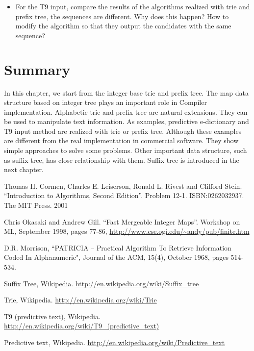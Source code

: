 \documentclass{article}
\begin{document}
\begin{Exercise}
\begin{itemize}
\item For the T9 input, compare the results of the algorithms realized with trie and prefix tree,
the sequences are different. Why does this happen? How to modify the algorithm so that they
output the candidates with the same sequence?
\end{itemize}
\end{Exercise}

\section{Summary}

In this chapter, we start from the integer base trie and prefix tree. The
map data structure based on integer tree plays an important role
in Compiler implementation. Alphabetic trie and prefix tree are
natural extensions. They can be used to manipulate text information.
As examples, predictive e-dictionary and T9 input method are
realized with trie or prefix tree. Although these examples
are different from the real implementation in commercial software.
They show simple approaches to solve some problems.
Other important data structure, such as suffix tree, has close
relationship with them. Suffix tree is introduced in the next chapter.

\begin{thebibliography}{99}

Thomas H. Cormen, Charles E. Leiserson, Ronald L. Rivest and Clifford Stein.
``Introduction to Algorithms, Second Edition''. Problem 12-1. ISBN:0262032937. The MIT Press. 2001

Chris Okasaki and Andrew Gill. ``Fast Mergeable Integer
Maps''. Workshop on ML, September 1998, pages 77-86, \url{http://www.cse.ogi.edu/~andy/pub/finite.htm}

D.R. Morrison, ``PATRICIA -- Practical Algorithm To Retrieve  Information Coded In Alphanumeric", Journal of the ACM, 15(4), October 1968, pages 514-534.

Suffix Tree, Wikipedia. \url{http://en.wikipedia.org/wiki/Suffix_tree}

Trie, Wikipedia. \url{http://en.wikipedia.org/wiki/Trie}

T9 (predictive text), Wikipedia. \url{http://en.wikipedia.org/wiki/T9_(predictive_text)}

Predictive text,
Wikipedia. \url{http://en.wikipedia.org/wiki/Predictive_text}

\end{thebibliography}

\ifx\wholebook\relax\else
\end{document}
